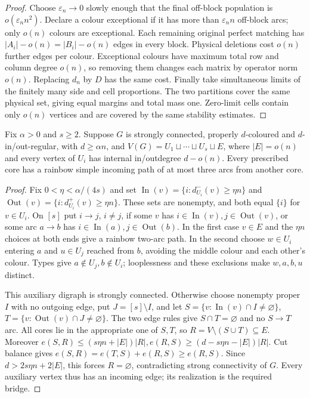 \begin{proof}
Choose $\varepsilon_n\to0$ slowly enough that the final off-block population is $o(\varepsilon_nn^2)$. Declare a colour exceptional if it has more than $\varepsilon_nn$ off-block arcs; only $o(n)$ colours are exceptional. Each remaining original perfect matching has $|A_i|-o(n)=|B_i|-o(n)$ edges in every block. Physical deletions cost $o(n)$ further edges per colour. Exceptional colours have maximum total row and column degree $o(n)$, so removing them changes each matrix by operator norm $o(n)$. Replacing $d_n$ by $D$ has the same cost. Finally take simultaneous limits of the finitely many side and cell proportions. The two partitions cover the same physical set, giving equal margins and total mass one. Zero-limit cells contain only $o(n)$ vertices and are covered by the same stability estimates.
\end{proof}

\begin{lemma}\label{gcp:bridge}
Fix $\alpha>0$ and $s\ge2$. Suppose $G$ is strongly connected, properly $d$-coloured and $d$-in/out-regular, with $d\ge\alpha{}n$, and $V(G)=U_1\sqcup\cdots\sqcup{}U_s\sqcup{}E$, where $|E|=o(n)$ and every vertex of $U_i$ has internal in/outdegree $d-o(n)$. Every prescribed core has a rainbow simple incoming path of at most three arcs from another core.
\end{lemma}
\begin{proof}
Fix $0<\eta<\alpha/(4s)$ and set $\operatorname{In}(v)=\{i:d^-_{U_i}(v)\ge\eta{}n\}$ and $\operatorname{Out}(v)=\{i:d^+_{U_i}(v)\ge\eta{}n\}$. These sets are nonempty, and both equal $\{i\}$ for $v\in{}U_i$. On $[s]$ put $i\to{}j$, $i\ne{}j$, if some $v$ has $i\in\operatorname{In}(v),j\in\operatorname{Out}(v)$, or some arc $a\to{}b$ has $i\in\operatorname{In}(a),j\in\operatorname{Out}(b)$. In the first case $v\in{}E$ and the $\eta{}n$ choices at both ends give a rainbow two-arc path. In the second choose $w\in{}U_i$ entering $a$ and $u\in{}U_j$ reached from $b$, avoiding the middle colour and each other's colour. Types give $a\notin{}U_j,b\notin{}U_i$; looplessness and these exclusions make $w,a,b,u$ distinct.

This auxiliary digraph is strongly connected. Otherwise choose nonempty proper $I$ with no outgoing edge, put $J=[s]\setminus{}I$, and let $S=\{v:\operatorname{In}(v)\cap{}I\ne\varnothing\}$, $T=\{v:\operatorname{Out}(v)\cap{}J\ne\varnothing\}$. The two edge rules give $S\cap{}T=\varnothing$ and no $S\to{}T$ arc. All cores lie in the appropriate one of $S,T$, so $R=V\setminus(S\cup{}T)\subseteq{}E$. Moreover $e(S,R)\le(s\eta{}n+|E|)|R|,e(R,S)\ge(d-s\eta{}n-|E|)|R|$. Cut balance gives $e(S,R)=e(T,S)+e(R,S)\ge{}e(R,S)$. Since $d>2s\eta{}n+2|E|$, this forces $R=\varnothing$, contradicting strong connectivity of $G$. Every auxiliary vertex thus has an incoming edge; its realization is the required bridge.
\end{proof}

